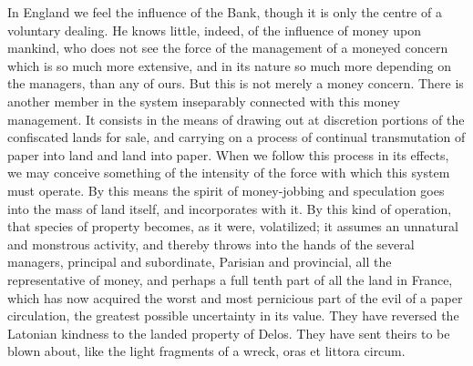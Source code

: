In England we feel the influence of the Bank, though it is only the centre of a voluntary dealing. He knows little, indeed, of the influence of money upon mankind, who does not see the force of the management of a moneyed concern which is so much more extensive, and in its nature so much more depending on the managers, than any of ours. But this is not merely a money concern. There is another member in the system inseparably connected with this money management. It consists in the means of drawing out at discretion portions of the confiscated lands for sale, and carrying on a process of continual transmutation of paper into land and land into paper. When we follow this process in its effects, we may conceive something of the intensity of the force with which this system must operate. By this means the spirit of money-jobbing and speculation goes into the mass of land itself, and incorporates with it. By this kind of operation, that species of property becomes, as it were, volatilized; it assumes an unnatural and monstrous activity, and thereby throws into the hands of the several managers, principal and subordinate, Parisian and provincial, all the representative of money, and perhaps a full tenth part of all the land in France, which has now acquired the worst and most pernicious part of the evil of a paper circulation, the greatest possible uncertainty in its value. They have reversed the Latonian kindness to the landed property of Delos. They have sent theirs to be blown about, like the light fragments of a wreck, oras et littora circum.

